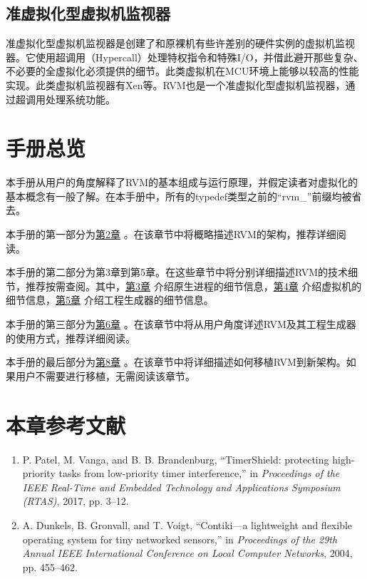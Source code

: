 \subsection{准虚拟化型虚拟机监视器}\label{subsec:1-2-5}

准虚拟化型虚拟机监视器是创建了和原裸机有些许差别的硬件实例的虚拟机监视器。它使用超调用（Hypercall）处理特权指令和特殊I/O，并借此避开那些复杂、不必要的全虚拟化必须提供的细节。此类虚拟机在MCU环境上能够以较高的性能实现。此类虚拟机监视器有Xen等。RVM也是一个准虚拟化型虚拟机监视器，通过超调用处理系统功能。

\section{手册总览}\label{sec:1-3}

本手册从用户的角度解释了RVM的基本组成与运行原理，并假定读者对虚拟化的基本概念有一般了解。在本手册中，所有的typedef类型之前的``rvm\_''前缀均被省去。

本手册的第一部分为\protect\hyperref[sec:2-1]{第2章}
。在该章节中将概略描述RVM的架构，推荐详细阅读。

本手册的第二部分为第3章到第5章。在这些章节中将分别详细描述RVM的技术细节，推荐按需查阅。其中，\protect\hyperref[sec:3-1]{第3章}
介绍原生进程的细节信息，\protect\hyperref[sec:4-1]{第4章}
介绍虚拟机的细节信息，\protect\hyperref[sec:5-1]{第5章}
介绍工程生成器的细节信息。

本手册的第三部分为\protect\hyperref[ch:6-using-rvm]{第6章}
。在该章节中将从用户角度详述RVM及其工程生成器的使用方式，推荐详细阅读。

本手册的最后部分为\protect\hyperref[sec:8-1]{第8章}
。在该章节中将详细描述如何移植RVM到新架构。如果用户不需要进行移植，无需阅读该章节。

\section{本章参考文献}\label{sec:1-4}

\begin{enumerate}
\def\labelenumi{{[}\arabic{enumi}{]}}
\item
  \protect{}\label{cite:1-1}
  P. Patel, M. Vanga, and B. B. Brandenburg, ``TimerShield: protecting
  high-priority tasks from low-priority timer interference,'' in
  \textit{Proceedings of the IEEE Real-Time and Embedded Technology and
  Applications Symposium (RTAS)}, 2017, pp. 3--12.
\item
  \protect{}\label{cite:1-2}
  A. Dunkels, B. Gronvall, and T. Voigt, ``Contiki---a lightweight and
  flexible operating system for tiny networked sensors,'' in
  \textit{Proceedings of the 29th Annual IEEE International Conference
  on Local Computer Networks}, 2004, pp. 455--462.
\end{enumerate}

